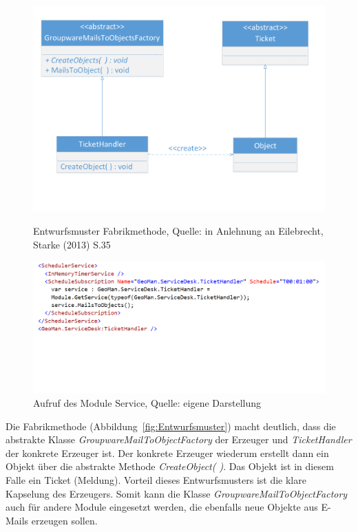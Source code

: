 \begin{figure}[htb]
    \centering
    \begin{minipage}[t]{0.47\textwidth}
        \centering
        \includegraphics[width=.90\textwidth]{Abbildungen/Entwurfsmuster.pdf}
        \caption[Entwurfsmuster Fabrikmethode]{Entwurfsmuster Fabrikmethode, Quelle: in Anlehnung an Eilebrecht, Starke (2013) S.35}
        \label{fig:Entwurfsmuster}
    \end{minipage}%
    \hfill
    \begin{minipage}[t]{0.47\textwidth}
        \centering
        \includegraphics[width=.99\textwidth]{Abbildungen/ModuleService.png}
        \caption[Aufruf des Module Service]{Aufruf des Module Service, Quelle: eigene Darstellung}
        \label{fig:ModuleService}
    \end{minipage}
\end{figure}

\noindent
Die Fabrikmethode (Abbildung~\ref{fig:Entwurfsmuster}) macht deutlich, dass die abstrakte Klasse \textit{GroupwareMailToObjectFactory} der Erzeuger und \textit{TicketHandler} der konkrete Erzeuger ist. Der konkrete Erzeuger wiederum erstellt dann ein Objekt über die abstrakte Methode \textit{CreateObject( )}. Das Objekt ist in diesem Falle ein Ticket (Meldung). Vorteil dieses Entwurfsmusters ist die klare Kapselung des Erzeugers. Somit kann die Klasse \textit{GroupwareMailToObjectFactory} auch für andere Module eingesetzt werden, die ebenfalls neue Objekte aus E-Mails erzeugen sollen.\\

